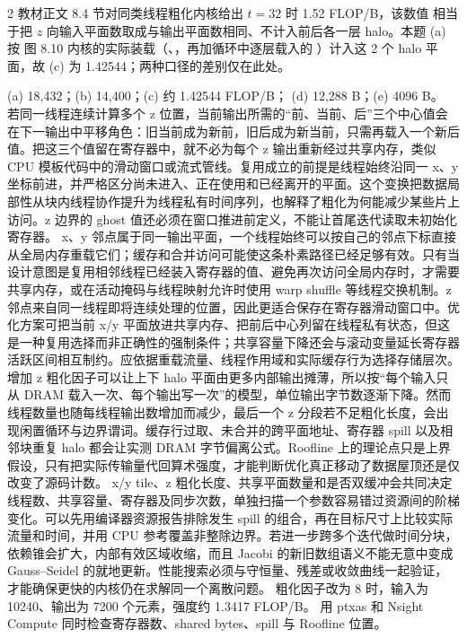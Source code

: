 \begin{solutionexercise}{2}
\editorialnote 教材正文 8.4 节对同类线程粗化内核给出 $t=32$ 时 1.52 FLOP/B，该数值
相当于把 $z$ 向输入平面数取成与输出平面数相同、不计入前后各一层 halo。本题 (a) 按
图 8.10 内核的实际装载（、，再加循环中逐层载入的
）计入这 2 个 halo 平面，故 (c) 为 1.42544；两种口径的差别仅在此处。

\conclusionheading (a) 18,432；(b) 14,400；(c) 约 1.42544 FLOP/B；
(d) 12,288 B；(e) 4096 B。
\discussionheading
{}
若同一线程连续计算多个 z 位置，当前输出所需的“前、当前、后”三个中心值会在下一输出中平移角色：旧当前成为新前，旧后成为新当前，只需再载入一个新后值。把这三个值留在寄存器中，就不必为每个 z 输出重新经过共享内存，类似 CPU 模板代码中的滑动窗口或流式管线。复用成立的前提是线程始终沿同一 x、y 坐标前进，并严格区分尚未进入、正在使用和已经离开的平面。这个变换把数据局部性从块内线程协作提升为线程私有时间序列，也解释了粗化为何能减少某些片上访问。z 边界的 ghost 值还必须在窗口推进前定义，不能让首尾迭代读取未初始化寄存器。
x、y 邻点属于同一输出平面，一个线程始终可以按自己的邻点下标直接从全局内存重载它们；缓存和合并访问可能使这条朴素路径已经足够有效。只有当设计意图是复用相邻线程已经装入寄存器的值、避免再次访问全局内存时，才需要共享内存，或在活动掩码与线程映射允许时使用 warp shuffle 等线程交换机制。z 邻点来自同一线程即将连续处理的位置，因此更适合保存在寄存器滑动窗口中。优化方案可把当前 x/y 平面放进共享内存、把前后中心列留在线程私有状态，但这是一种复用选择而非正确性的强制条件；共享容量下降还会与滚动变量延长寄存器活跃区间相互制约。应依据重载流量、线程作用域和实际缓存行为选择存储层次。
增加 z 粗化因子可以让上下 halo 平面由更多内部输出摊薄，所以按“每个输入只从 DRAM 载入一次、每个输出写一次”的模型，单位输出字节数逐渐下降。然而线程数量也随每线程输出数增加而减少，最后一个 z 分段若不足粗化长度，会出现闲置循环与边界谓词。缓存行过取、未合并的跨平面地址、寄存器 spill 以及相邻块重复 halo 都会让实测 DRAM 字节偏离公式。Roofline 上的理论点只是上界假设，只有把实际传输量代回算术强度，才能判断优化真正移动了数据屋顶还是仅改变了源码计数。
x/y tile、z 粗化长度、共享平面数量和是否双缓冲会共同决定线程数、共享容量、寄存器及同步次数，单独扫描一个参数容易错过资源间的阶梯变化。可以先用编译器资源报告排除发生 spill 的组合，再在目标尺寸上比较实际流量和时间，并用 CPU 参考覆盖非整除边界。若进一步跨多个迭代做时间分块，依赖锥会扩大，内部有效区域收缩，而且 Jacobi 的新旧数组语义不能无意中变成 Gauss--Seidel 的就地更新。性能搜索必须与守恒量、残差或收敛曲线一起验证，才能确保更快的内核仍在求解同一个离散问题。
\variantheading 粗化因子改为 8 时，输入为 10240、输出为 7200 个元素，强度约 1.3417 FLOP/B。
\practiceheading 用 ptxas 和 Nsight Compute 同时检查寄存器数、shared bytes、spill 与 Roofline 位置。
\end{solutionexercise}

